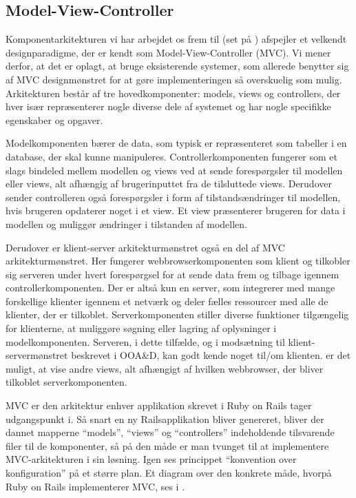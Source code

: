 \subsection{Model-View-Controller}
\label{subsec:mvc}
Komponentarkitekturen vi har arbejdet os frem til (set på ) afspejler et velkendt designparadigme, der er kendt som Model-View-Controller (MVC)\cite{designpatterns}. Vi mener derfor, at det er oplagt, at bruge eksisterende systemer, som allerede benytter sig af MVC designmønstret for at gøre implementeringen så overskuelig som mulig. Arkitekturen består af tre hovedkomponenter: models, views og controllers, der hver især repræsenterer nogle diverse dele af systemet og har nogle specifikke egenskaber og opgaver. 

Modelkomponenten bærer de data, som typisk er repræsenteret som tabeller i en database, der skal kunne manipuleres. Controllerkomponenten fungerer som et slags bindeled mellem modellen og views ved at sende forespørgsler til modellen eller views, alt afhængig af brugerinputtet fra de tilsluttede views. Derudover sender controlleren også forespørgsler i form af tilstandsændringer til modellen, hvis brugeren \fx opdaterer noget i et view. Et view præsenterer brugeren for data i modellen og muliggør ændringer i tilstanden af modellen.

Derudover er klient-server arkitekturmønstret også en del af MVC arkitekturmønstret. Her fungerer webbrowserkomponenten som klient og tilkobler sig serveren under hvert forespørgsel for at sende data frem og tilbage igennem controllerkomponenten. Der er altså kun en server, som integrerer med mange forskellige klienter igennem et netværk og deler fælles ressourcer med alle de klienter, der er tilkoblet. Serverkomponenten stiller diverse funktioner tilgængelig for klienterne, \fx at muliggøre søgning eller lagring af oplysninger i modelkomponenten. Serveren, i dette tilfælde, og i modsætning til klient-servermønstret beskrevet i OOA\&D\cite{ooad}, kan godt kende noget til/om klienten. \Fx er det muligt, at vise andre views, alt afhængigt af hvilken webbrowser, der bliver tilkoblet serverkomponenten.


MVC er den arkitektur enhver applikation skrevet i Ruby on Rails tager udgangspunkt i. Så snart en ny Railsapplikation bliver genereret, bliver der dannet mapperne ``models'', ``views'' og ``controllers'' indeholdende tilsvarende filer til de komponenter, så på den måde er man tvunget til at implementere MVC-arkitekturen i sin løsning. Igen ses princippet ``konvention over konfiguration'' på et større plan. Et diagram over den konkrete måde, hvorpå Ruby on Rails implementerer MVC, ses i .
